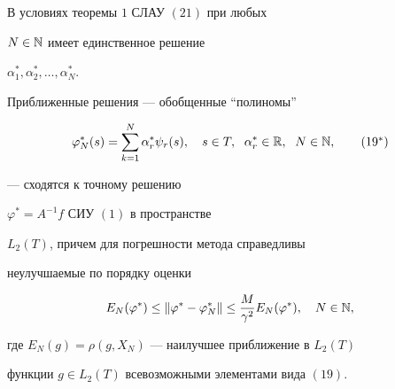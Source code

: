 \begin{thm}


В условиях теоремы $1$ СЛАУ $(21)$ при любых


$N\in \Bbb{N}$ имеет единственное решение 


$\alpha_1^*, \alpha^*_2,\dotsc, \alpha_N^*$. 


Приближенные решения --- обобщенные ``полиномы''


\begin{equation}


\vp_N^*(s) = \sum_{k=1}^N \alpha_r^* \psi_r(s),


\quad s\in T,\ \; \alpha^*_r\in \R,\ \; N\in\N,


\tag{$19^*$}


\end{equation}


--- сходятся к точному решению


$ \varphi^\ast =A^{-1}f $ СИУ $(1)$ в пространстве


$ L_2(T) $, причем для погрешности метода справедливы


неулучшаемые по порядку оценки


\begin{equation}


E_N(\varphi ^\ast )\leq \|\varphi ^\ast -\varphi^* _N\|\leq


\frac{M}{\gamma ^{2}} E_N(\varphi ^\ast ), \quad N\in \Bbb{N},


\end{equation}


где $ E_N(g)=\rho (g,X_N)$ --- наилучшее приближение в $ L_2(T) $


функции $ g \in L_2(T) $ всевозможными элементами вида $(19)$.


\end{thm}








